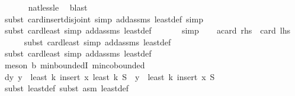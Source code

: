 \begin{isabellebody}
\ \ \ \ \ \isamarkupfalse%
\ nat{\isacharunderscore}{\kern0pt}less{\isacharunderscore}{\kern0pt}le\ \isamarkupfalse%
\ blast\isanewline
\ \ \ \ \isamarkupfalse%
\ {\isacharparenleft}{\kern0pt}subst\ card{\isacharunderscore}{\kern0pt}insert{\isacharunderscore}{\kern0pt}disjoint{\isacharcomma}{\kern0pt}\ simp\ add{\isacharcolon}{\kern0pt}assms\ least{\isacharunderscore}{\kern0pt}def{\isacharcomma}{\kern0pt}\ simp{\isacharparenright}{\kern0pt}\isanewline
\ \ \ \ \isamarkupfalse%
\ {\isacharparenleft}{\kern0pt}subst\ card{\isacharunderscore}{\kern0pt}least{\isacharcomma}{\kern0pt}\ simp\ add{\isacharcolon}{\kern0pt}assms\ least{\isacharunderscore}{\kern0pt}def{\isacharparenright}{\kern0pt}\ \isanewline
\ \ \ \ \isamarkupfalse%
\ simp\isanewline
\ \ \isamarkupfalse%
\ a{\isacharcolon}{\kern0pt}{\isachardoublequoteopen}card\ {\isacharquery}{\kern0pt}rhs\ {\isasymle}\ card\ {\isacharquery}{\kern0pt}lhs{\isachardoublequoteclose}\isanewline
\ \ \ \ \isamarkupfalse%
\ {\isacharparenleft}{\kern0pt}subst\ card{\isacharunderscore}{\kern0pt}least{\isacharcomma}{\kern0pt}\ simp\ add{\isacharcolon}{\kern0pt}assms\ least{\isacharunderscore}{\kern0pt}def{\isacharparenright}{\kern0pt}\isanewline
\ \ \ \ \isamarkupfalse%
\ {\isacharparenleft}{\kern0pt}subst\ card{\isacharunderscore}{\kern0pt}least{\isacharcomma}{\kern0pt}\ simp\ add{\isacharcolon}{\kern0pt}assms\ least{\isacharunderscore}{\kern0pt}def{\isacharparenright}{\kern0pt}\isanewline
\ \ \ \ \isamarkupfalse%
\ {\isacharparenleft}{\kern0pt}meson\ b\ min{\isachardot}{\kern0pt}boundedI\ min{\isachardot}{\kern0pt}cobounded{}{\isacharparenright}{\kern0pt}\isanewline
\isanewline
\ \ \isamarkupfalse%
\ d{\isacharcolon}{\kern0pt}{\isachardoublequoteopen}{\isasymAnd}y{\isachardot}{\kern0pt}\ y\ {\isasymin}\ least\ k\ {\isacharparenleft}{\kern0pt}insert\ x\ {\isacharparenleft}{\kern0pt}least\ k\ S{\isacharparenright}{\kern0pt}{\isacharparenright}{\kern0pt}\ {\isasymLongrightarrow}\ y\ {\isasymin}\ least\ k\ {\isacharparenleft}{\kern0pt}insert\ x\ S{\isacharparenright}{\kern0pt}{\isachardoublequoteclose}\ \isanewline
\ \ \ \ \isamarkupfalse%
\ {\isacharparenleft}{\kern0pt}subst\ least{\isacharunderscore}{\kern0pt}def{\isacharcomma}{\kern0pt}\ subst\ {\isacharparenleft}{\kern0pt}asm{\isacharparenright}{\kern0pt}\ least{\isacharunderscore}{\kern0pt}def{\isacharparenright}{\kern0pt}\isanewline
\ \ \ \ \isamarkupfalse%

\end{isabellebody}
